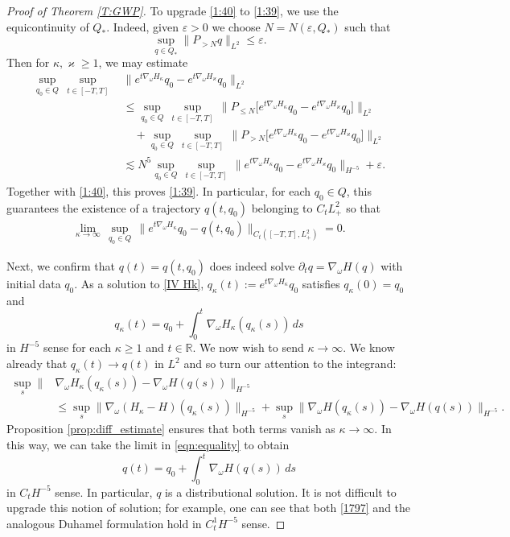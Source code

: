 \documentclass{amsart}
\numberwithin{equation}{section}
\theoremstyle{definition}
\newcommand{\om}{\omega}
\newcommand{\ka}{\kappa}
\newcommand{\vk}{\varkappa}
\newcommand{\eps}{\varepsilon}
\newcommand{\R}{\mathbb{R}}
\newcommand{\na}{\nabla}
\newcommand{\dd}{\partial}
\begin{document}
\begin{proof}[Proof of Theorem \ref{T:GWP}]
To upgrade \eqref{1:40} to \eqref{1:39}, we use the equicontinuity of $Q_\ast$.  Indeed, given $\eps>0$ we choose $N=N(\eps, Q_*)$ such that
$$
\sup_{q\in Q_\ast}\|P_{>N} q\|_{L^2} \leq \eps.
$$ 
Then for $\ka,\vk\geq1$, we may estimate
\begin{align*}
\sup_{q_0\in Q}\,\sup_{t\in[-T,T]}\, &\bigl\|e^{t\na_\om H_{\ka}}q_0 - e^{t\na_\om H_{\varkappa}}q_0\bigr\|_{L^2}\\
&\leq\sup_{q_0\in Q}\,  \sup_{t\in[-T,T]}\,\bigl\|P_{\leq N}\bigl[e^{t\na_\om H_{\ka}}q_0 - e^{t\na_\om H_{\varkappa}}q_0\bigr]\bigr\|_{L^2}\\
&\quad +\sup_{q_0\in Q}\,  \sup_{t\in[-T,T]}\,\bigl\|P_{> N}\bigl[e^{t\na_\om H_{\ka}}q_0 - e^{t\na_\om H_{\varkappa}}q_0\bigr]\bigr\|_{L^2}\\
&\lesssim N^5\sup_{q_0\in Q}\,  \sup_{t\in[-T,T]}\, \bigl\|e^{t\na_\om H_{\ka}}q_0 - e^{t\na_\om H_{\varkappa}}q_0\bigr\|_{H^{-5}}+\eps.
\end{align*}
Together with \eqref{1:40}, this proves \eqref{1:39}. In particular, for each $q_0\in Q$, this guarantees the existence of a trajectory $q(t,q_0)$ belonging to $C_tL_+^2$ so that 
\begin{align}\label{1:41}
\lim_{\ka\to \infty}\, \sup_{q_0\in Q} \, \bigl\| e^{t\na_\om H_{\ka}}q_0 - q(t,q_0)\bigr\|_{C_t([-T,T],L^2_+)}=0.
\end{align}

Next, we confirm that $q(t)=q(t,q_0)$ does indeed solve $\dd_t q=\na_\om H(q)$ with initial data $q_0$.  As a solution to \eqref{IV Hk}, $q_\kappa(t):=e^{t\na_\om H_{\ka}}q_0$ satisfies $q_\kappa(0)=q_0$ and
\begin{equation}\label{eqn:equality}
q_{\ka}(t)=q_0+\int_0^t \na_\om H_\ka (q_\ka(s))\,ds
\end{equation}
in $H^{-5}$ sense for each $\kappa\geq 1$ and $t\in\R$.  We now wish to send $\kappa\to\infty$.  We know already that  $q_{\ka}(t)\rightarrow q(t)$ in $L^2$ and so turn our attention to the integrand:
\begin{align*}
\sup_{s} \|&\na_\om H_\ka(q_\ka(s))-\na_\om H(q(s))\|_{H^{-5}}\\
&\leq\sup_{s}\|\na_\om (H_\ka-H)(q_\ka(s))\|_{H^{-5}}+\sup_{s}\|\na_\om H(q_\ka(s))-\na_\om H(q(s))\|_{H^{-5}}.
\end{align*}
Proposition \ref{prop:diff_estimate} ensures that both terms vanish as $\ka\to\infty$. In this way, we can take the limit in \eqref{eqn:equality} to obtain
\begin{equation}\label{1797}
q(t)=q_0+\int_0^t \na_\om H (q(s))\,ds
\end{equation}
in $C_tH^{-5}$ sense. In particular, $q$ is a distributional solution.  It is not difficult to upgrade this notion of solution; for example, one can see that  both \eqref{1797} and the analogous Duhamel formulation hold in $C_t^1H^{-5}$ sense.


\end{proof}
\end{document}
